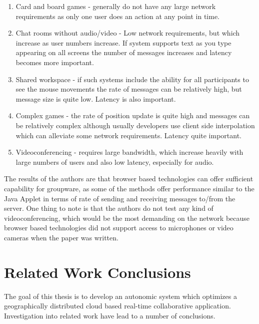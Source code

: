 {\begin{enumerate}
	\item Card and board games - generally do not have any large network requirements as only one user does an action at any point in time.
	\item Chat rooms without audio/video - Low network requirements, but which increase as user numbers increase. If system supports text as you type appearing on all screens the number of messages increases and latency becomes more important.
	\item Shared workspace - if such systems include the ability for all participants to see the mouse movements the rate of messages can be relatively high, but message size is quite low. Latency is also important.
	\item Complex games - the rate of position update is quite high and messages can be relatively complex although usually developers use client side interpolation which can alleviate some network requirements. Latency quite important.
	\item Videoconferencing - requires large bandwidth, which increase heavily with large numbers of users and also low latency, especially for audio.
\end{enumerate}

The results of the authors are that browser based technologies can offer sufficient capability for groupware, as some of the methods offer performance similar to the Java Applet in terms of rate of sending and receiving messages to/from the server. One thing to note is that the authors do not test any kind of videoconferencing, which would be the most demanding on the network because browser based technologies did not support access to microphones or video cameras when the paper was written.

\section{Related Work Conclusions}

The goal of this thesis is to develop an autonomic system which optimizes a geographically distributed cloud based real-time collaborative application. Investigation into related work have lead to a number of conclusions. 

}
